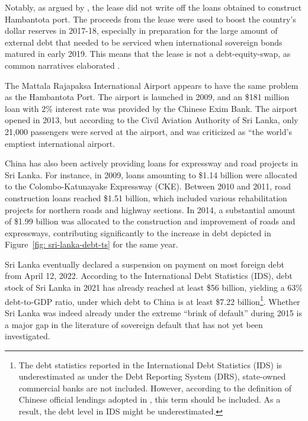 Notably, as argued by \citet*{Moramudali_2019}, the lease did not write off the loans obtained to construct Hambantota port. The proceeds from the lease were used to boost the country's dollar reserves in 2017-18, especially in preparation for the large amount of external debt that needed to be serviced when international sovereign bonds matured in early 2019. This means that the lease is not a debt-equity-swap, as common narratives elaborated \citep*{Moramudali_2020}.

The Mattala Rajapaksa International Airport appears to have the same problem as the Hambantota Port. The airport is launched in 2009, and an \$181 million loan with 2\% interest rate was provided by the Chinese Exim Bank. The airport opened in 2013, but according to the Civil Aviation Authority of Sri Lanka, only 21,000 passengers were served at the airport, and was criticized as ``the world's emptiest international airport\citep*{shepard-16-airport-empty}.

China has also been actively providing loans for expressway and road projects in Sri Lanka. For instance, in 2009, loans amounting to \$1.14 billion were allocated to the Colombo-Katunayake Expressway (CKE). Between 2010 and 2011, road construction loans reached \$1.51 billion, which included various rehabilitation projects for northern roads and highway sections. In 2014, a substantial amount of \$1.99 billion was allocated to the construction and improvement of roads and expressways, contributing significantly to the increase in debt depicted in Figure~\ref{fig: sri-lanka-debt-ts} for the same year.

Sri Lanka eventually declared a suspension on payment on most foreign debt from April 12, 2022. According to the International Debt Statistics (IDS), debt stock of Sri Lanka in 2021 has already reached at least \$56 billion, yielding a 63\% debt-to-GDP ratio, under which debt to China is at least \$7.22 billion\footnote{
    The debt statistics reported in the International Debt Statistics (IDS) is underestimated as under the Debt Reporting System (DRS), state-owned commercial banks are not included. However, according to the definition of Chinese official lendings adopted in \citet*{Horn-Reinhart-Trebesch-21}, this term should be included. As a result, the debt level in IDS might be underestimated.
}. Whether Sri Lanka was indeed already under the extreme ``brink of default'' during 2015 is a major gap in the literature of sovereign default that has not yet been investigated.
